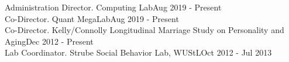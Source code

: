 \begin{samepage}\begin{rSection}{\textrm{Administration}}
Director. \R Computing Lab\hfill Aug 2019 - Present\smallskip\\
Co-Director. Quant MegaLab\hfill Aug 2019 - Present\smallskip\\
Co-Director. Kelly/Connolly Longitudinal Marriage Study on Personality and Aging\hfill Dec 2012 - Present\smallskip\\
Lab Coordinator. Strube Social Behavior Lab,  WUStL\hfill Oct 2012 - Jul 2013\end{rSection}\end{samepage}%